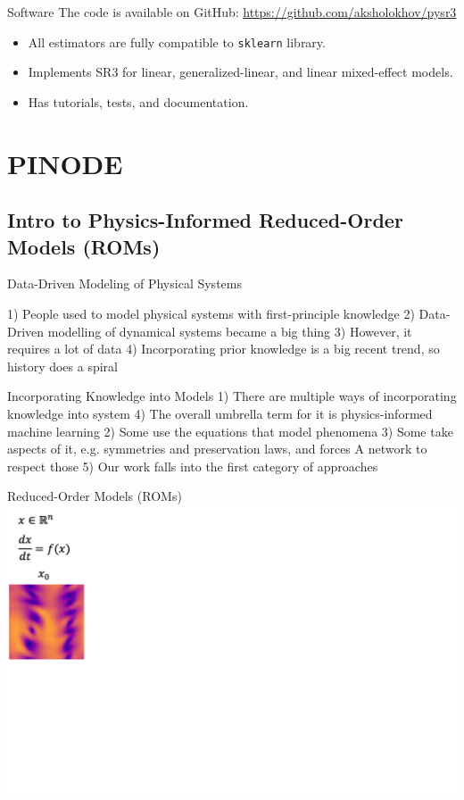 \documentclass[8pt]{beamer}
\begin{document}
\begin{frame}{Software}
	The code is available on GitHub: \href{github.com/aksholokhov/pysr3}{https://github.com/aksholokhov/pysr3}
	\begin{itemize}
		\item All estimators are fully compatible to \texttt{sklearn} library.
		\item Implements SR3 for linear, generalized-linear, and linear mixed-effect models.
		\item Has tutorials, tests, and documentation.
	\end{itemize}
\end{frame}

\section{PINODE}

\subsection{Intro to Physics-Informed Reduced-Order Models (ROMs)}

\begin{frame}{Data-Driven Modeling of Physical Systems}

1) People used to model physical systems with first-principle knowledge
2) Data-Driven modelling of dynamical systems became a big thing  
3) However, it requires a lot of data 
4) Incorporating prior knowledge is a big recent trend, so history does a spiral

\end{frame}


\begin{frame}{Incorporating Knowledge into Models}
1) There are multiple ways of incorporating knowledge into system 
4) The overall umbrella term for it is physics-informed machine learning
2) Some use the equations that model phenomena
3) Some take aspects of it, e.g. symmetries and preservation laws, and forces
A network to respect those
5) Our work falls into the first category of approaches
\end{frame}


\begin{frame}{Reduced-Order Models (ROMs)}
\includegraphics[width=\textwidth]{Figures/roms_1}
\end{frame}
\end{document}
